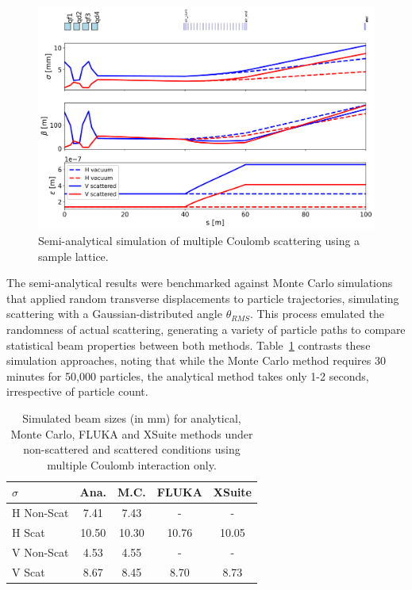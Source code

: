 \documentclass[a4paper,
               biblatex,     %
               ]{jacow}
\begin{document}
\begin{figure}[!htb]
   \centering
   \includegraphics*[width=1.0\columnwidth]{THPR032_f2.png}
   \caption{Semi-analytical simulation of multiple Coulomb scattering using a sample lattice.}
   \label{fig:simple_line}
\end{figure}

The semi-analytical results were benchmarked against Monte Carlo simulations that applied random transverse displacements to particle trajectories, simulating scattering with a Gaussian-distributed angle $\theta_{RMS}$. This process emulated the randomness of actual scattering, generating a variety of particle paths to compare statistical beam properties between both methods. Table~\ref{tab:sigma_comparison} contrasts these simulation approaches, noting that while the Monte Carlo method requires 30 minutes for 50,000 particles, the analytical method takes only 1-2 seconds, irrespective of particle count. 

\begin{table}[ht]
\centering
\caption{Simulated beam sizes (in mm) for analytical, Monte Carlo, FLUKA and XSuite methods under non-scattered and scattered conditions using multiple Coulomb interaction only.}
\begin{tabular}{lcccc}
\hline
$\sigma$ & Ana. & M.C. & FLUKA & XSuite \\
\hline
H Non-Scat & 7.41 & 7.43 & - & -\\
H Scat & 10.50 & 10.30 & 10.76 & 10.05 \\
V Non-Scat & 4.53 & 4.55 & - & -\\
V Scat & 8.67 & 8.45 & 8.70 & 8.73 \\
\hline
\end{tabular}
\label{tab:sigma_comparison}
\end{table}
\end{document}
